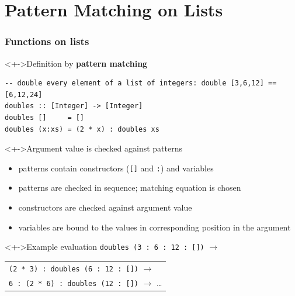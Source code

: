 \documentclass{beamer}
\begin{document}
\section{Pattern Matching on Lists}
\begin{frame}[fragile]
  \frametitle{Functions on lists}
  \begin{block}<+->{Definition by \textbf{pattern matching}}
\begin{lstlisting}
-- double every element of a list of integers: double [3,6,12] == [6,12,24]
doubles :: [Integer] -> [Integer]
doubles []     = []
doubles (x:xs) = (2 * x) : doubles xs
\end{lstlisting}
  \end{block}
  \begin{alertblock}<+->{Argument value is checked against patterns}
    \footnotesize{}
    \begin{itemize}
    \item patterns contain constructors (\lstinline{[]} and \lstinline{:}) and variables
    \item patterns are checked in sequence; matching equation is chosen
    \item constructors are checked against argument value
    \item variables are bound to the values in
      corresponding position in the argument
    \end{itemize}
  \end{alertblock}
  \begin{block}<+->{Example evaluation}
    \lstinline{doubles (3 : 6 : 12 : [])} $\rightarrow$
    \begin{tabular}[t]{l}
    \lstinline|(2 * 3) : doubles (6 : 12 : [])| $\rightarrow$ \\
    \lstinline|6 : (2 * 6) : doubles (12 : [])| $\rightarrow$ \dots
    \end{tabular}
  \end{block}
\end{frame}
\end{document}
